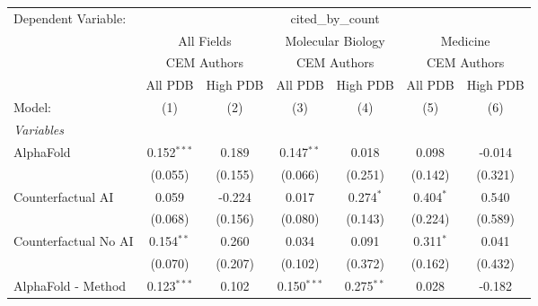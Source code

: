 \begingroup
\centering
\begin{tabular}{lcccccc}
   \tabularnewline \midrule \midrule
   Dependent Variable: & \multicolumn{6}{c}{cited\_by\_count}\\
 & \multicolumn{2}{c}{All Fields} & \multicolumn{2}{c}{Molecular Biology} & \multicolumn{2}{c}{Medicine} \\
\cmidrule(lr){2-3} \cmidrule(lr){4-5} \cmidrule(lr){6-7}
 & \multicolumn{2}{c}{CEM Authors} & \multicolumn{2}{c}{CEM Authors} & \multicolumn{2}{c}{CEM Authors} \\
\cmidrule(lr){2-3} \cmidrule(lr){4-5} \cmidrule(lr){6-7}
 & \multicolumn{1}{c}{All PDB} & \multicolumn{1}{c}{High PDB} & \multicolumn{1}{c}{All PDB} & \multicolumn{1}{c}{High PDB} & \multicolumn{1}{c}{All PDB} & \multicolumn{1}{c}{High PDB} \\
\cmidrule(lr){2-2} \cmidrule(lr){3-3} \cmidrule(lr){4-4} \cmidrule(lr){5-5} \cmidrule(lr){6-6} \cmidrule(lr){7-7}
   Model:                                                     & (1)           & (2)          & (3)           & (4)           & (5)           & (6)\\  
   \midrule
   \emph{Variables}\\
   AlphaFold                                                  & 0.152$^{***}$ & 0.189        & 0.147$^{**}$  & 0.018         & 0.098         & -0.014\\   
                                                              & (0.055)       & (0.155)      & (0.066)       & (0.251)       & (0.142)       & (0.321)\\   
   Counterfactual AI                                          & 0.059         & -0.224       & 0.017         & 0.274$^{*}$   & 0.404$^{*}$   & 0.540\\   
                                                              & (0.068)       & (0.156)      & (0.080)       & (0.143)       & (0.224)       & (0.589)\\   
   Counterfactual No AI                                       & 0.154$^{**}$  & 0.260        & 0.034         & 0.091         & 0.311$^{*}$   & 0.041\\   
                                                              & (0.070)       & (0.207)      & (0.102)       & (0.372)       & (0.162)       & (0.432)\\   
   AlphaFold - Method                                         & 0.123$^{***}$ & 0.102        & 0.150$^{***}$ & 0.275$^{**}$  & 0.028         & -0.182\\   

\end{tabular}
